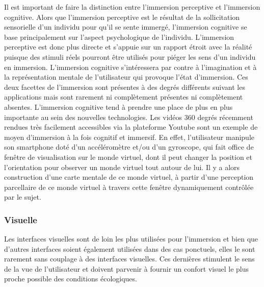 Il est important de faire la distinction entre l'immersion perceptive et l'immersion cognitive. Alors que l'immersion perceptive est le résultat de la sollicitation sensorielle d'un individu pour qu'il se sente immergé, l'immersion cognitive se base principalement sur l'aspect psychologique de l'individu. 
L'immersion perceptive est donc plus directe et s'appuie sur un rapport étroit avec la réalité puisque des stimuli réels pourront être utilisés pour piéger les sens d'un individu en immersion. L'immersion cognitive s'intéressera par contre à l'imagination et à la représentation mentale de l'utilisateur qui provoque l'état d'immersion. Ces deux facettes de l'immersion sont présentes à des degrés différents suivant les applications mais sont rarement ni complètement présentes ni complètement absentes. L'immersion cognitive tend à prendre une place de plus en plus importante au sein des nouvelles technologies. Les vidéos 360 degrés récemment rendues très facilement accessibles via la plateforme Youtube sont un exemple de moyen d'immersion à la fois cognitif et immersif. En effet, l'utilisateur  manipule son smartphone doté d'un accéléromètre et/ou d'un gyroscope, qui fait office de fenêtre de visualisation sur le monde virtuel, dont il peut changer la position et l'orientation pour observer un monde virtuel tout autour de lui. Il y a alors construction d'une carte mentale de ce monde virtuel, à partir d'une perception parcellaire de ce monde virtuel à travers cette fenêtre dynamiquement contrôlée par le sujet.

\subsubsection{Visuelle}\label{immersion_visuelle}

Les interfaces visuelles sont de loin les plus utilisées pour l'immersion et bien que d'autres interfaces soient également utilisées dans des cas ponctuels, elles le sont rarement sans couplage à des interfaces visuelles. Ces dernières stimulent le sens de la vue de l'utilisateur et doivent parvenir à fournir un confort visuel le plus proche possible des conditions écologiques.

 \label{stereo_3d}

